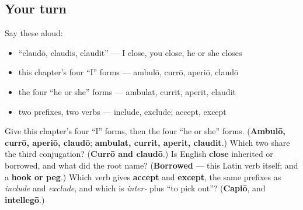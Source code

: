 \subsection*{Your turn}
Say these aloud:

\begin{itemize}
\raggedright
  \item \textquotedblleft{}claudō, claudis, claudit\textquotedblright{} — I close, you close, he or she closes
  \item this chapter's four \textquotedblleft{}I\textquotedblright{} forms — ambulō, currō, aperiō, claudō
  \item the four \textquotedblleft{}he or she\textquotedblright{} forms — ambulat, currit, aperit, claudit
  \item two prefixes, two verbs — include, exclude; accept, except
\end{itemize}

\begin{tcolorbox}[breakable,colback=teal!4,colframe=teal!35!black,title={Before you move on}]
Give this chapter's four \textquotedblleft{}I\textquotedblright{} forms, then the four \textquotedblleft{}he or she\textquotedblright{} forms. (\textbf{Ambulō, currō, aperiō, claudō}; \textbf{ambulat, currit, aperit, claudit}.) Which two share the third conjugation? (\textbf{Currō and claudō}.) Is English \textbf{close} inherited or borrowed, and what did the root name? (\textbf{Borrowed} — this Latin verb itself; and a \textbf{hook or peg}.) Which verb gives \textbf{accept} and \textbf{except}, the same prefixes as \emph{include} and \emph{exclude}, and which is \emph{inter-} plus \textquotedblleft{}to pick out\textquotedblright{}? (\textbf{Capiō}, and \textbf{intellegō}.)
\end{tcolorbox}
